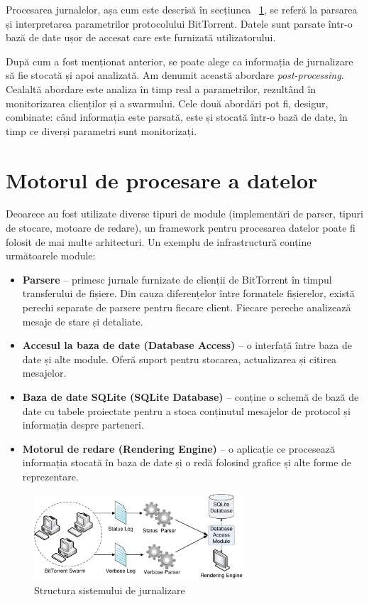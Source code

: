 Procesarea jurnalelor, așa cum este descrisă în secțiunea
~\ref{sec:proto-measure:data-processing}, se referă la parsarea și interpretarea
parametrilor protocolului BitTorrent. Datele sunt parsate într-o bază de date
ușor de accesat care este furnizată utilizatorului.

După cum a fost menționat anterior, se poate alege ca informația de jurnalizare
să fie stocată și apoi analizată. Am denumit această abordare 
\textit{post-processing}. Cealaltă abordare este analiza în timp real a
parametrilor, rezultând în monitorizarea clienților și a swarmului. Cele două
abordări pot fi, desigur, combinate: când informația este parsată, este
și stocată într-o bază de date, în timp ce diverși parametri sunt monitorizați.

\section{Motorul de procesare a datelor}
\label{sec:proto-measure:data-processing}

Deoarece au fost utilizate diverse tipuri de module (implementări de parser,
tipuri de stocare, motoare de redare), un framework pentru procesarea datelor
poate fi folosit de mai multe arhitecturi. Un exemplu de infrastructură conține
următoarele module:

\begin{itemize}
  \item \textbf{Parsere} -- primesc jurnale furnizate de clienții de BitTorrent
  în timpul transferului de fișiere. Din cauza diferențelor între formatele
  fișierelor, există perechi separate de parsere pentru fiecare client.
  Fiecare pereche analizează mesaje de stare și detaliate.
  \item \textbf{Accesul la baza de date (Database Access)} -- o interfață între baza de date
  și alte module. Oferă suport pentru stocarea, actualizarea și citirea
  mesajelor.
  \item \textbf{Baza de date SQLite (SQLite Database)} -- conține o schemă de bază de date cu
  tabele proiectate pentru a stoca conținutul mesajelor de protocol și
  informația despre parteneri.
  \item \textbf{Motorul de redare (Rendering Engine)} -- o aplicație ce procesează informația
  stocată în baza de date și o redă folosind grafice și alte forme de
  reprezentare.
\end{itemize}

\begin{figure}[h]
  \begin{center}
    \includegraphics[width=0.7\textwidth]{src/img/proto-measure/logarch-not-use}
  \end{center}
  \caption{Structura sistemului de jurnalizare}
  \label{fig:proto-measure:logarch}
\end{figure}

